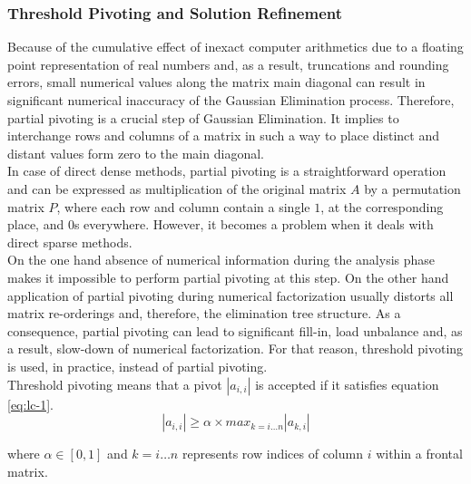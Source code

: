 \subsubsection{Threshold Pivoting and Solution Refinement}
\label{subseq:pivot-hadling}


Because of the cumulative effect of inexact computer arithmetics due to a floating point representation of real numbers and, as a result, truncations and rounding errors, small numerical values along the matrix main diagonal can result in significant numerical inaccuracy of the Gaussian Elimination process. Therefore, partial pivoting is a crucial step of Gaussian Elimination. It implies to interchange rows and columns of a matrix in such a way to place distinct and distant values form zero to the main diagonal.\\


In case of direct dense methods, partial pivoting is a straightforward operation and can be expressed as multiplication of the original matrix $A$ by a permutation matrix $P$, where each row and column contain a single $1$, at the corresponding place, and $0$s everywhere. However, it becomes a problem when it deals with direct sparse methods.\\


On the one hand absence of numerical information during the analysis phase makes it impossible to perform partial pivoting at this step. On the other hand application of partial pivoting during numerical factorization usually distorts all matrix re-orderings and, therefore, the elimination tree structure. As a consequence, partial pivoting can lead to significant fill-in, load unbalance and, as a result, slow-down of numerical factorization. For that reason, threshold pivoting is used, in practice, instead of partial pivoting.\\


Threshold pivoting means that a pivot $|a_{i,i}|$ is accepted if it satisfies equation \ref{eq:lc-1}.\\
\begin{equation}\label{eq:lc-1}
|a_{i,i}| \geq \alpha \times max_{k=i \dots n} |a_{k,i}|
\end{equation}

where $\alpha \in [0,1]$ and $k=i \dots n$ represents row indices of column $i$ within a frontal matrix.\\

